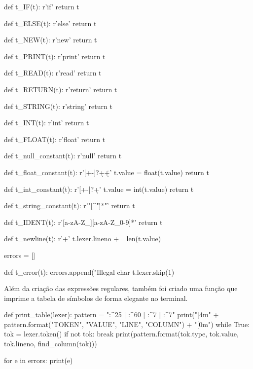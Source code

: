 \documentclass[
	12pt,				%
	openright,			%
	twoside,			%
	a4paper,			%
	english,			%
	french,				%
	spanish,			%
	brazil				%
	]{abntex2}
\begin{document}
\begin{python}
def t_IF(t):
    r'if'
    return t

def t_ELSE(t):
    r'else'
    return t

def t_NEW(t):
    r'new'
    return t

def t_PRINT(t):
    r'print'
    return t

def t_READ(t):
    r'read'
    return t

def t_RETURN(t):
    r'return'
    return t

def t_STRING(t):
    r'string'
    return t

def t_INT(t):
    r'int'
    return t

def t_FLOAT(t):
    r'float'
    return t
\end{python}

\begin{python}
def t_null_constant(t):
    r'null'
    return t

def t_float_constant(t):
    r'[+-]?\d+\.\d+'
    t.value = float(t.value)
    return t
\end{python}
\newpage
\begin{python}
def t_int_constant(t):
    r'[+-]?\d+'
    t.value = int(t.value)
    return t

def t_string_constant(t):
    r'"[^"\n\r]*"'
    return t

def t_IDENT(t):
    r'[a-zA-Z_][a-zA-Z_0-9]*'
    return t

def t_newline(t):
    r'\n+'
    t.lexer.lineno += len(t.value)

errors = []

def t_error(t):
    errors.append("Illegal char %
    t.lexer.skip(1)
\end{python}

Além da criação das expressões regulares, também foi criado uma função que imprime 
a tabela de símbolos de forma elegante no terminal.
\\
\begin{python}
def print_table(lexer):
    pattern = "{:^25} | {:^60} | {:^7} | {:^7}"
    print("[4m" + pattern.format("TOKEN", "VALUE", "LINE", "COLUMN") + "[0m")
    while True:
        tok = lexer.token()
        if not tok:
            break
        print(pattern.format(tok.type, tok.value, tok.lineno, find_column(tok))) 

    for e in errors:
        print(e)

\end{python}
\newpage
\end{document}
